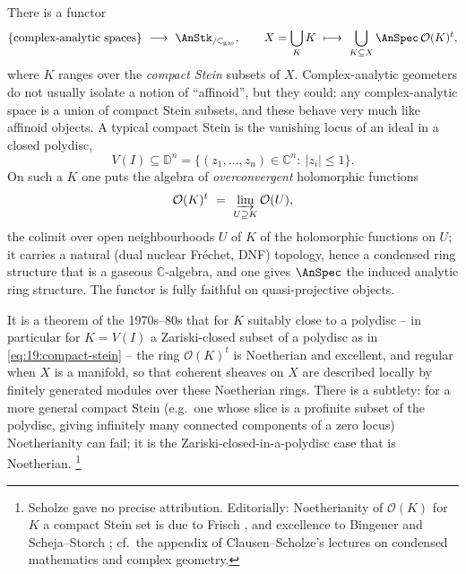 \begin{example}
\label{ex:19:complex-analytic}
There is a functor
\begin{equation*}
\{\text{complex-analytic spaces}\}\ \longrightarrow\ \AnStk_{/\mathbb C_{\mathrm{gas}}},
\qquad
X=\bigcup_K K\ \longmapsto\ \bigcup_{K\subseteq X}\AnSpec\,\mathcal O(K)^{t},
\end{equation*}
where $K$ ranges over the \emph{compact Stein} subsets of $X$. Complex-analytic
geometers do not usually isolate a notion of ``affinoid'', but they could: any
complex-analytic space is a union of compact Stein subsets, and these behave very
much like affinoid objects. A typical compact Stein is the vanishing locus of an
ideal in a closed polydisc,
\begin{equation}
\label{eq:19:compact-stein}
V(I)\subseteq\mathbb D^n=\{(z_1,\dots,z_n)\in\mathbb C^n:\ |z_i|\le1\}.
\end{equation}
On such a $K$ one puts the algebra of \emph{overconvergent} holomorphic functions
\begin{equation}
\label{eq:19:overconvergent}
\mathcal O(K)^{t}\ =\ \varinjlim_{U\supseteq K}\mathcal O(U),
\end{equation}
the colimit over open neighbourhoods $U$ of $K$ of the holomorphic functions on
$U$; it carries a natural (dual nuclear Fréchet, DNF) topology, hence a condensed
ring structure that is a gaseous $\mathbb C$-algebra, and one gives $\AnSpec$ the
induced analytic ring structure. The functor is fully faithful on quasi-projective
objects.
\end{example}

\begin{remark}
\label{rmk:19:stein-noetherian}
It is a theorem of the 1970s--80s that for $K$ suitably close to a polydisc --
in particular for $K=V(I)$ a Zariski-closed subset of a polydisc as in
\eqref{eq:19:compact-stein} -- the ring $\mathcal O(K)^t$ is Noetherian and
excellent, and regular when $X$ is a manifold, so that coherent sheaves on $X$ are
described locally by finitely generated modules over these Noetherian rings.
There is a subtlety: for a more general compact Stein (e.g.\ one whose slice is a
profinite subset of the polydisc, giving infinitely many connected components of a
zero locus) Noetherianity can fail; it is the Zariski-closed-in-a-polydisc case
that is Noetherian.%
\footnote{Scholze gave no precise attribution. Editorially: Noetherianity of
$\mathcal O(K)$ for $K$ a compact Stein set is due to Frisch
\cite{Frisch_1967}, and excellence to Bingener \cite{Bingener_1978} and
Scheja--Storch \cite{Scheja_1972}; cf.\ the appendix of Clausen--Scholze's
lectures on condensed mathematics and complex geometry.}
\end{remark}

